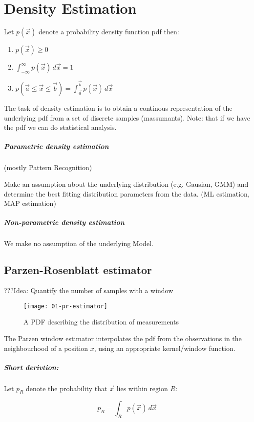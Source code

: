 
\section{Density Estimation}
Let $p(\vec{x})$ denote a probability density function pdf then:

\begin{enumerate}
  \item $p(\vec{x}) \ge 0$
  \item $\int_{-\infty}^\infty p(\vec{x}) \,d\vec{x} = 1$
  \item $p(\vec{a} \le \vec{x} \le \vec{b}) = \int_{\vec{a}}^{\vec{b}} p(\vec{x}) \,d\vec{x}$
\end{enumerate}

The task of density estimation is to obtain a continous representation of the underlying pdf from a set of discrete samples (massumants). Note: that if we have the pdf we can do statistical analysis.

\subparagraph{Parametric density estimation}
(mostly Pattern Recognition)

Make an assumption about the underlying distribution (e.g. Gausian, GMM) and determine the best fitting distribution parameters from the data. (ML estimation, MAP estimation)

\subparagraph{Non-parametric density estimation}

We make no assumption of the underlying Model.

\subsection{Parzen-Rosenblatt estimator}
???Idea: Quantify the number of samples with a window

\begin{figure}[H]
  \centering
  \texttt{[image: 01-pr-estimator]}
  \caption{A PDF describing the distribution of measurements}
\end{figure}

The Parzen window estimator interpolates the pdf from the observations in the neighbourhood of a position $x$, using an appropriate kernel/window function.

\subparagraph{Short derivtion:}
Let $p_R$ denote the probability that $\vec{x}$ lies within region $R$:

\begin{equation*}
  p_R = \int_R p(\vec{x}) \,d\vec{x}
\end{equation*}

